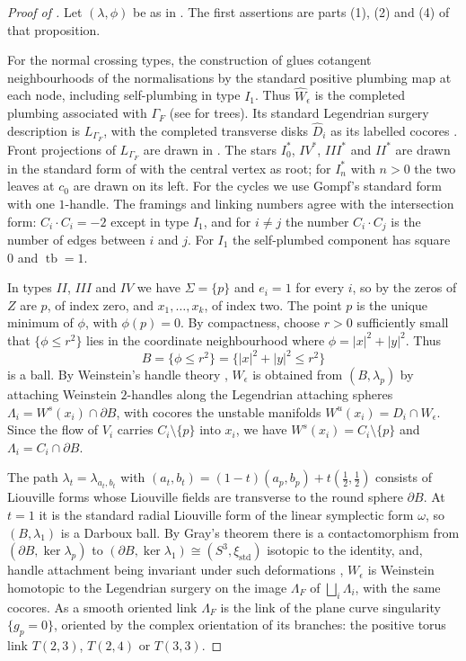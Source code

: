 \documentclass[a4paper]{amsart}
\numberwithin{equation}{section}
\begin{document}
\begin{proof}[Proof of ]
Let $(\lambda,\phi)$ be as in . The
first assertions are parts (1), (2) and (4) of that proposition.

For the normal crossing types, the construction of
 glues cotangent neighbourhoods of
the normalisations by the standard positive plumbing map at each node,
including self-plumbing in type $I_1$. Thus $\widehat W_\epsilon$ is
the completed plumbing associated with $\Gamma_F$
(see \cite[Proposition~7.3]{SmithThomas} for trees).
Its standard Legendrian surgery description is $L_{\Gamma_F}$, with
the completed transverse disks $\widehat D_i$ as its labelled cocores
\cite[Section~3]{ELplumbing}.
Front projections of $L_{\Gamma_F}$ are drawn in
.
The stars $I_0^*$, $IV^*$,
$III^*$ and $II^*$ are drawn in the standard form of
\cite[Figures~2 and~3]{EtguLekiliKoszul} with the central vertex as root;
for $I_n^*$ with $n>0$ the two leaves at $c_0$ are drawn on its left. For
the cycles we use Gompf's standard form \cite{Gompf98} with one
$1$-handle. The framings and linking numbers
agree with the intersection form: $C_i\cdot C_i=-2$ except in type
$I_1$, and for $i\ne j$
the number $C_i\cdot C_j$ is the number of edges between $i$ and $j$.
For $I_1$ the self-plumbed component has square $0$ and
$\operatorname{tb}=1$.

In types $II$, $III$ and $IV$ we have $\Sigma=\{p\}$ and $e_i=1$ for
every $i$, so by  the zeros of $Z$ are
$p$, of index zero, and $x_1,\dots,x_k$, of index two. The point
$p$ is the unique minimum of $\phi$, with $\phi(p)=0$. By compactness,
choose $r>0$ sufficiently small that $\{\phi\le r^2\}$ lies in the
coordinate neighbourhood where $\phi=|x|^2+|y|^2$. Thus
\[
 B=\{\phi\le r^2\}=\{|x|^2+|y|^2\le r^2\}
\]
is a ball. By Weinstein's handle theory \cite{Weinstein91,CE}, $W_\epsilon$ is obtained
from $(B,\lambda_p)$ by attaching Weinstein $2$-handles along the
Legendrian attaching spheres
$\Lambda_i=W^s(x_i)\cap\partial B$, with cocores the unstable manifolds
$W^u(x_i)=D_i\cap W_\epsilon$. Since the flow of $V_i$ carries
$C_i\setminus\{p\}$ into $x_i$, we have $W^s(x_i)=C_i\setminus\{p\}$ and
$\Lambda_i=C_i\cap\partial B$.

The path $\lambda_t=\lambda_{a_t,b_t}$ with
$(a_t,b_t)=(1-t)(a_p,b_p)+t(\frac12,\frac12)$ consists of Liouville
forms whose Liouville fields are transverse to the round sphere
$\partial B$. At $t=1$ it is the standard radial Liouville form of the
linear symplectic form $\omega$, so $(B,\lambda_1)$ is a Darboux ball.
By Gray's theorem there is a contactomorphism
from $(\partial B,\ker\lambda_p)$ to
$(\partial B,\ker\lambda_1)\cong(S^3,\xi_{\mathrm{std}})$ isotopic to the
identity, and, handle attachment being invariant under such deformations
\cite{CE}, $W_\epsilon$ is Weinstein homotopic to the Legendrian surgery
on the image $\Lambda_F$ of $\bigsqcup_i\Lambda_i$, with the same cocores.
As a smooth oriented link $\Lambda_F$ is the link of the plane curve
singularity $\{g_p=0\}$, oriented by the complex
orientation of its branches: the positive torus link $T(2,3)$, $T(2,4)$
or $T(3,3)$.


\end{proof}
\end{document}
